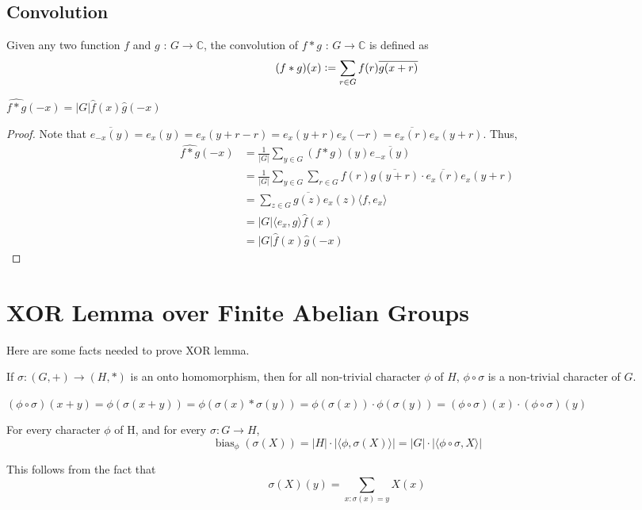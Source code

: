 \section{Convolution}
\begin{definition}
Given any two function $f$ and $g$ : $G \rightarrow \mathbb{C}$, the convolution of $f*g$ :  $G \rightarrow \mathbb{C}$ is defined as
$$(f*g)(x) \vcentcolon= \sum\limits_{r \in G} f(r) \overline{g(x +r)}$$
\end{definition}

\begin{prop}
$\widehat{f*g}(-x) = |G| \widehat{f}(x) \widehat{g}(-x)$
\end{prop}

\begin{proof}
Note that $\overline{e_{-x}(y)} = e_x(y) = e_x(y+r - r) = e_x(y+r) e_x(-r) = \overline {e_x(r)} e_x(y+r)$. Thus,
\begin{align*}
\widehat{f*g}(-x)
& = \frac{1}{|G|} \sum\limits_{y \in G} (f*g)(y) \overline{e_{-x}(y)} \\
& = \frac{1}{|G|} \sum\limits_{y \in G}	
	\sum\limits_{r \in G} f(r) \overline{g(y +r)} \cdot  \overline{e_x(r)} e_x(y+r)\\
& = \sum\limits_{z \in G}	
	\overline{g(z)} e_x(z) \langle	f, e_x \rangle\\
& =|G| \langle e_x, g \rangle \widehat{f}(x) \\
& = |G| \widehat{f}(x) \widehat{g}(-x)		 	
\end{align*}
\end{proof}

\chapter{XOR Lemma over Finite Abelian Groups}

Here are some facts needed to prove XOR lemma. 
\begin{fact}
If $\sigma : (G, +) \rightarrow (H, *)$ is an onto homomorphism, then for all non-trivial character $\phi$ of $H$, $\phi \circ \sigma$ is a non-trivial character of $G$.
\end{fact} 
$(\phi \circ \sigma)(x+y) = \phi (\sigma (x+y)) = \phi (\sigma(x) * \sigma(y))
= \phi (\sigma (x)) \cdot \phi (\sigma (y)) 
= (\phi \circ \sigma)(x) \cdot (\phi \circ \sigma)(y)$

\begin{fact}
For every character $\phi$ of H, and for every $\sigma: G \rightarrow H$,
$$\operatorname{bias}_\phi(\sigma (X))
= |H| \cdot |\langle \phi, \sigma(X) \rangle | 
= |G| \cdot |\langle \phi \circ \sigma, X \rangle |$$
\end{fact}
This follows from the fact that
$$\sigma(X)(y) = \sum\limits_{x : \sigma(x) = y} X(x)$$

